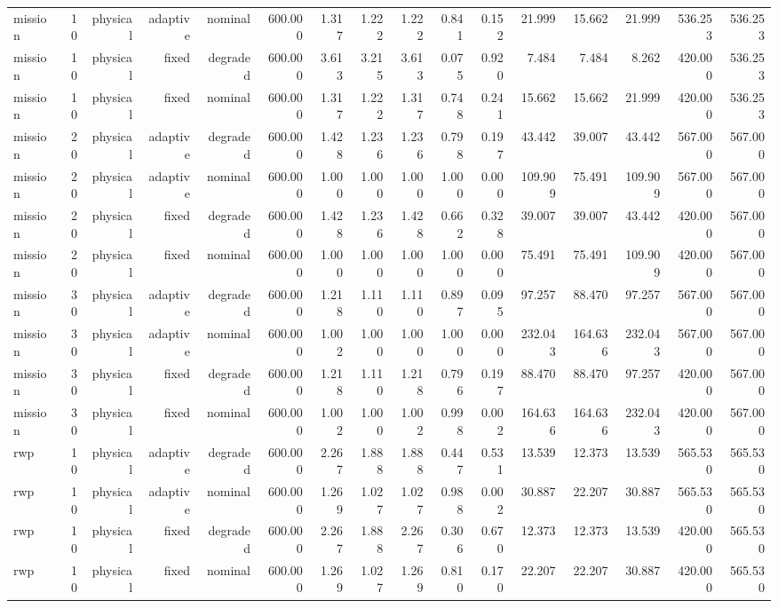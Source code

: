 \begin{tabular}{lrrrrrrrrrrrrrrr}
mission & 10 & physical & adaptive & nominal & 600.000 & 1.317 & 1.222 & 1.222 & 0.841 & 0.152 & 21.999 & 15.662 & 21.999 & 536.253 & 536.253 \\
mission & 10 & physical & fixed & degraded & 600.000 & 3.613 & 3.215 & 3.613 & 0.075 & 0.920 & 7.484 & 7.484 & 8.262 & 420.000 & 536.253 \\
mission & 10 & physical & fixed & nominal & 600.000 & 1.317 & 1.222 & 1.317 & 0.748 & 0.241 & 15.662 & 15.662 & 21.999 & 420.000 & 536.253 \\
mission & 20 & physical & adaptive & degraded & 600.000 & 1.428 & 1.236 & 1.236 & 0.798 & 0.197 & 43.442 & 39.007 & 43.442 & 567.000 & 567.000 \\
mission & 20 & physical & adaptive & nominal & 600.000 & 1.000 & 1.000 & 1.000 & 1.000 & 0.000 & 109.909 & 75.491 & 109.909 & 567.000 & 567.000 \\
mission & 20 & physical & fixed & degraded & 600.000 & 1.428 & 1.236 & 1.428 & 0.662 & 0.328 & 39.007 & 39.007 & 43.442 & 420.000 & 567.000 \\
mission & 20 & physical & fixed & nominal & 600.000 & 1.000 & 1.000 & 1.000 & 1.000 & 0.000 & 75.491 & 75.491 & 109.909 & 420.000 & 567.000 \\
mission & 30 & physical & adaptive & degraded & 600.000 & 1.218 & 1.110 & 1.110 & 0.897 & 0.095 & 97.257 & 88.470 & 97.257 & 567.000 & 567.000 \\
mission & 30 & physical & adaptive & nominal & 600.000 & 1.002 & 1.000 & 1.000 & 1.000 & 0.000 & 232.043 & 164.636 & 232.043 & 567.000 & 567.000 \\
mission & 30 & physical & fixed & degraded & 600.000 & 1.218 & 1.110 & 1.218 & 0.796 & 0.197 & 88.470 & 88.470 & 97.257 & 420.000 & 567.000 \\
mission & 30 & physical & fixed & nominal & 600.000 & 1.002 & 1.000 & 1.002 & 0.998 & 0.002 & 164.636 & 164.636 & 232.043 & 420.000 & 567.000 \\
rwp & 10 & physical & adaptive & degraded & 600.000 & 2.267 & 1.888 & 1.888 & 0.447 & 0.531 & 13.539 & 12.373 & 13.539 & 565.530 & 565.530 \\
rwp & 10 & physical & adaptive & nominal & 600.000 & 1.269 & 1.027 & 1.027 & 0.988 & 0.002 & 30.887 & 22.207 & 30.887 & 565.530 & 565.530 \\
rwp & 10 & physical & fixed & degraded & 600.000 & 2.267 & 1.888 & 2.267 & 0.306 & 0.670 & 12.373 & 12.373 & 13.539 & 420.000 & 565.530 \\
rwp & 10 & physical & fixed & nominal & 600.000 & 1.269 & 1.027 & 1.269 & 0.810 & 0.170 & 22.207 & 22.207 & 30.887 & 420.000 & 565.530 \\

\end{tabular}
